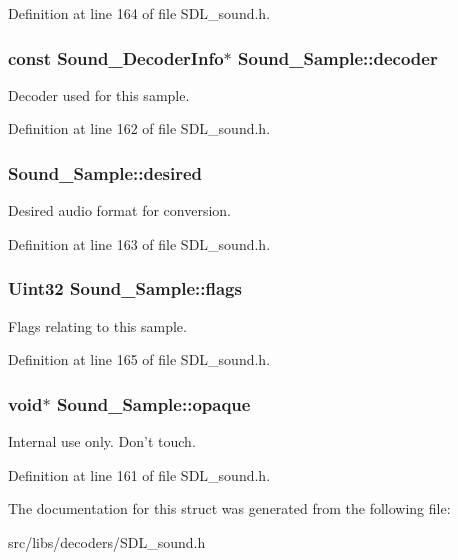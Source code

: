 Definition at line 164 of file S\-D\-L\-\_\-sound.\-h.

\hypertarget{structSound__Sample_a03ef7710992520e65edacc9ad694b034}{
\subsubsection[{decoder}]{\setlength{\rightskip}{0pt plus 5cm}const {\bf Sound\-\_\-\-Decoder\-Info}$\ast$ {\bf Sound\-\_\-\-Sample\-::decoder}}}\label{structSound__Sample_a03ef7710992520e65edacc9ad694b034}
Decoder used for this sample. 

Definition at line 162 of file S\-D\-L\-\_\-sound.\-h.

\hypertarget{structSound__Sample_aca3059080501599b2fef90032122108d}{
\subsubsection[{desired}]{ {\bf Sound\-\_\-\-Sample\-::desired}}}\label{structSound__Sample_aca3059080501599b2fef90032122108d}
Desired audio format for conversion. 

Definition at line 163 of file S\-D\-L\-\_\-sound.\-h.

\hypertarget{structSound__Sample_a0faf525fbd34bc2553be187c4fcee8d1}{
\subsubsection[{flags}]{\setlength{\rightskip}{0pt plus 5cm}Uint32 {\bf Sound\-\_\-\-Sample\-::flags}}}\label{structSound__Sample_a0faf525fbd34bc2553be187c4fcee8d1}
Flags relating to this sample. 

Definition at line 165 of file S\-D\-L\-\_\-sound.\-h.

\hypertarget{structSound__Sample_af9b14d108498631919187832d74efa11}{
\subsubsection[{opaque}]{\setlength{\rightskip}{0pt plus 5cm}void$\ast$ {\bf Sound\-\_\-\-Sample\-::opaque}}}\label{structSound__Sample_af9b14d108498631919187832d74efa11}
Internal use only. Don't touch. 

Definition at line 161 of file S\-D\-L\-\_\-sound.\-h.



The documentation for this struct was generated from the following file\-:\begin{DoxyCompactItemize}
\item 
src/libs/decoders/S\-D\-L\-\_\-sound.\-h\end{DoxyCompactItemize}

